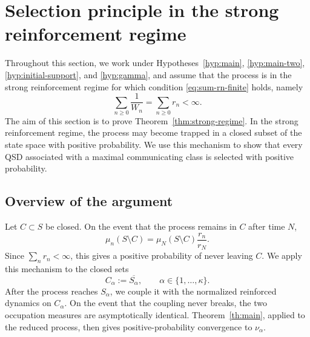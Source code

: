 \documentclass[10pt,letterpaper]{article}
\theoremstyle{compactplain}
\theoremstyle{compactdefinition}
\newcommand{\1}{\mathds{1}}
\begin{document}
\section{Selection principle in the strong reinforcement regime}\label{sec:strong-regime}


Throughout this section, we work under Hypotheses~\ref{hyp:main},
\ref{hyp:main-two}, \ref{hyp:initial-support}, and \ref{hyp:gamma}, and assume
that the process is in the strong reinforcement regime for which condition \eqref{eq:sum-rn-finite} holds, namely
\begin{equation*}
\sum_{n\geq0}\frac1{W_n}
=
\sum_{n\geq0}r_n
<\infty.
\end{equation*}
The aim of this section is to prove Theorem~\ref{thm:strong-regime}. In the strong reinforcement regime, the process may become trapped in a closed subset of the state space with positive probability. We use this mechanism to show
that every QSD associated with a maximal communicating class is selected with positive probability.


\subsection{Overview of the argument}



Let \(C\subset S\) be closed. On the event that the process remains in \(C\)
after time \(N\),
\[
\mu_n(S\setminus C)
=
\mu_N(S\setminus C)\frac{r_n}{r_N}.
\]
Since \(\sum_n r_n<\infty\), this gives a positive probability of never
leaving \(C\).
We apply this mechanism to the closed sets
\[
C_\alpha:=\overline{S_\alpha},
\qquad
\alpha\in\{1,\ldots,\kappa\}.
\]
After the
process reaches \(S_\alpha\), we couple it with the normalized reinforced
dynamics on \(C_\alpha\). On the event that the coupling never breaks, the two
occupation measures are asymptotically identical. Theorem~\ref{th:main},
applied to the reduced process, then gives positive-probability convergence
to \(\nu_\alpha\).

\end{document}
